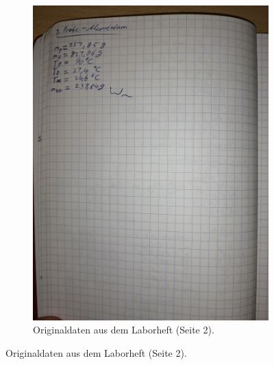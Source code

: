\begin{figure}
\begin{subfigure}{0.48\textwidth}
        \includegraphics[width=\textwidth]{content/data/daten2.jpg}
        \caption{Originaldaten aus dem Laborheft (Seite 2).}
    \end{subfigure}
\end{figure}